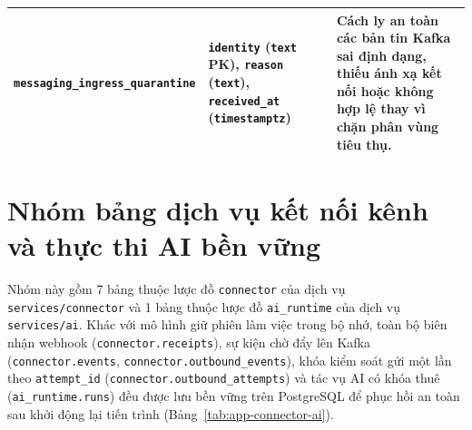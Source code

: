 \begin{table}[htbp]
\begin{tabularx}{\linewidth}{@{}
    >{\raggedright\arraybackslash}p{3.4cm}
    >{\raggedright\arraybackslash}p{5.0cm}
    >{\raggedright\arraybackslash}X@{}}
    \texttt{messaging\_\hspace{0pt}ingress\_\hspace{0pt}quarantine} &
    \texttt{identity} (\texttt{text} PK), \texttt{reason} (\texttt{text}), \texttt{received\_at} (\texttt{timestamptz}) &
    Cách ly an toàn các bản tin Kafka sai định dạng, thiếu ánh xạ kết nối hoặc không hợp lệ thay vì chặn phân vùng tiêu thụ. \\
    \bottomrule
  \end{tabularx}
\end{table}

\section{Nhóm bảng dịch vụ kết nối kênh và thực thi AI bền vững}
Nhóm này gồm 7 bảng thuộc lược đồ \texttt{connector} của dịch vụ \texttt{services/\hspace{0pt}connector} và 1 bảng thuộc lược đồ \texttt{ai\_\hspace{0pt}runtime} của dịch vụ \texttt{services/\hspace{0pt}ai}. Khác với mô hình giữ phiên làm việc trong bộ nhớ, toàn bộ biên nhận webhook (\texttt{connector.\hspace{0pt}receipts}), sự kiện chờ đẩy lên Kafka (\texttt{connector.\hspace{0pt}events}, \texttt{connector.\hspace{0pt}outbound\_\hspace{0pt}events}), khóa kiểm soát gửi một lần theo \texttt{attempt\_\hspace{0pt}id} (\texttt{connector.\hspace{0pt}outbound\_\hspace{0pt}attempts}) và tác vụ AI có khóa thuê (\texttt{ai\_\hspace{0pt}runtime.\hspace{0pt}runs}) đều được lưu bền vững trên PostgreSQL để phục hồi an toàn sau khởi động lại tiến trình (Bảng~\ref{tab:app-connector-ai}).

